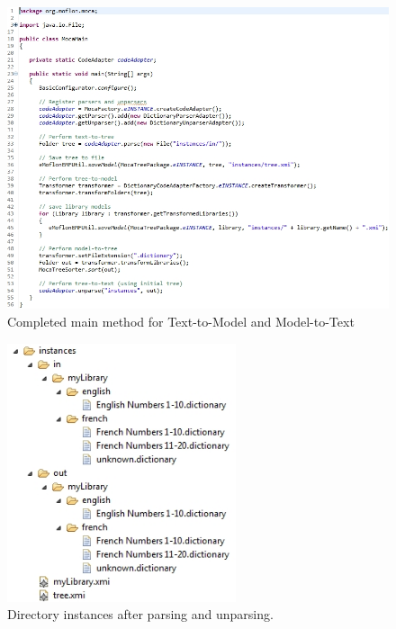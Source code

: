 \begin{enumerate}
\begin{figure}[!htbp]
\begin{center}
 \includegraphics[width=\textwidth]{pics/moca/5MocaTreeToText/MocaMainComplete}
  \caption{Completed main method for Text-to-Model and Model-to-Text} 
  \label{fig:moca-DictionaryTemplates}
\end{center}
\end{figure}

\begin{figure}[!htbp]
\begin{center}
 \includegraphics[width=0.6\textwidth]{pics/moca/5MocaTreeToText/InstancesAfterRoundTrip}
  \caption{Directory instances after parsing and unparsing.} 
  \label{fig:moca-DictionaryTemplates}
\end{center}
\end{figure}

\end{enumerate}